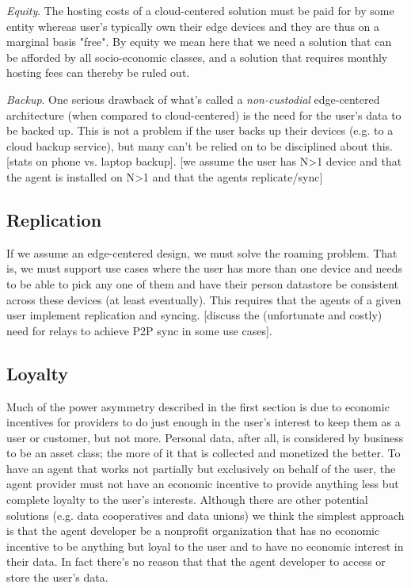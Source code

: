\documentclass[11pt, oneside]{article}   	%
\begin{document}
\emph{Equity}. The hosting costs of a cloud-centered solution must be paid for by some entity whereas user's typically own their edge devices and they are thus on a marginal basis "free". By equity we mean here that we need a solution that can be afforded by all socio-economic classes, and a solution that requires monthly hosting fees can thereby be ruled out. 

\emph{Backup}. One serious drawback of what's called a \emph{non-custodial} edge-centered architecture (when compared to cloud-centered) is the need for the user's data to be backed up. This is not a problem if the user backs up their devices (e.g. to a cloud backup service), but many can't be relied on to be disciplined about this. [stats on phone vs. laptop backup]. [we assume the user has N>1 device and that the agent is installed on N>1 and that the agents replicate/sync]

\subsection{Replication}

If we assume an edge-centered design, we must solve the roaming problem. That is, we must support use cases where the user has more than one device and needs to be able to pick any one of them and have their person datastore be consistent across these devices (at least eventually). This requires that the agents of a given user implement replication and syncing. [discuss the (unfortunate and costly) need for relays to achieve P2P sync in some use cases].

\subsection{Loyalty}

Much of the power asymmetry described in the first section is due to economic incentives for providers to do just enough in the user's interest to keep them as a user or customer, but not more. Personal data, after all, is considered by business to be an asset class; the more of it that is collected and monetized the better. To have an agent that works not partially but exclusively on behalf of the user, the agent provider must not have an economic incentive to provide anything less but complete loyalty to the user's interests. Although there are other potential solutions (e.g. data cooperatives and data unions) we think the simplest approach is that the agent developer be a nonprofit organization that has no economic incentive to be anything but loyal to the user and to have no economic interest in their data. In fact there's no reason that that the agent developer to access or store the user's data.
\end{document}
